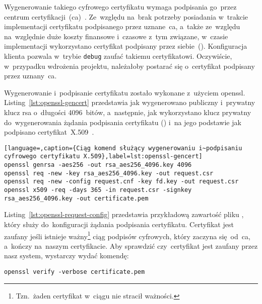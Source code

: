 \documentclass[thesis]{subfiles}
\begin{document}
Wygenerowanie takiego cyfrowego certyfikatu wymaga podpisania go~przez centrum certyfikacji~(\gls{ca})~\cite{wiki:ca}. Ze~względu na~brak potrzeby posiadania w~trakcie implementacji certyfikatu podpisanego przez uznane~\gls{ca}, a~także ze~względu na~względnie duże koszty finansowe i~czasowe z~tym związane, w~czasie implementacji wykorzystano certyfikat podpisany przez siebie~(). Konfiguracja klienta pozwala w~trybie \texttt{debug} zaufać takiemu certyfikatowi. Oczywiście, w~przypadku wdrożenia projektu, należałoby postarać się o~certyfikat podpisany przez uznany~\gls{ca}.

Wygenerowanie i~podpisanie certyfikatu zostało wykonane z~użyciem \gls{openssl}. Listing~\ref{lst:openssl-gencert} przedstawia jak wygenerowano publiczny i~prywatny klucz \gls{rsa} o~długości 4096~bitów, a~następnie, jak wykorzystano klucz prywatny do~wygenerowania żądania podpisania certyfikatu () i~na jego podstawie jak podpisano certyfikat~X.509~\cite{openssl-cookbook,wiki:csr}.

\begin{minipage}{\linewidth} %
\begin{lstlisting}[language=,caption={Ciąg komend służący wygenerowaniu i~podpisaniu cyfrowego certyfikatu X.509},label=lst:openssl-gencert]
openssl genrsa -aes256 -out rsa_aes256_4096.key 4096
openssl req -new -key rsa_aes256_4096.key -out request.csr
openssl req -new -config request.cnf -key fd.key -out request.csr
openssl x509 -req -days 365 -in request.csr -signkey rsa_aes256_4096.key -out certificate.pem
\end{lstlisting}
\end{minipage}

Listing~\ref{lst:openssl-request-config} przedstawia przykładową zawartość pliku , który służy do~konfiguracji żądania podpisania certyfikatu. Certyfikat jest zaufany jeśli istnieje ważny\footnote{Tzn.~żaden certyfikat w~ciągu nie stracił ważności.} ciąg podpisów cyfrowych, który zaczyna się~od~\gls{ca}, a~kończy na~naszym certyfikacie. Aby sprawdzić czy~certyfikat jest zaufany przez nasz system, wystarczy wydać komendę:\mynobreakpar

\begin{center}
	\texttt{openssl verify -verbose certificate.pem}
\end{center}
\end{document}
